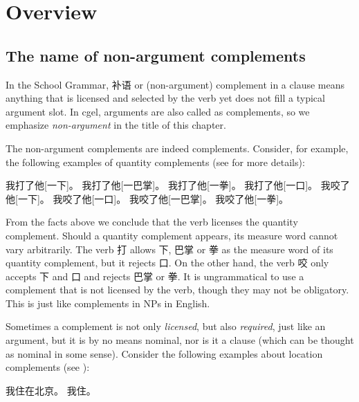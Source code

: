 \documentclass[../main.tex]{subfiles}
\begin{document}

\section{Overview}

\subsection{The name of non-argument complements}

In the School Grammar, 补语 or (non-argument) complement in a clause means anything that is licensed and 
selected by the verb yet does not fill a typical argument slot. In \ac{cgel}, arguments are also called 
as complements, so we emphasize \emph{non-argument} in the title of this chapter. 

The non-argument complements are indeed complements. Consider, for example, the following examples
of quantity complements (see  for more details):
\begin{exe}
    \ex \begin{xlist}
        \ex 我打了他[一下]。
        \ex 我打了他[一巴掌]。
        \ex 我打了他[一拳]。
        \ex *我打了他[一口]。
        \ex 我咬了他[一下]。
        \ex 我咬了他[一口]。
        \ex *我咬了他[一巴掌]。
        \ex *我咬了他[一拳]。
    \end{xlist}
\end{exe}
From the facts above we conclude that the verb licenses the quantity complement. Should a quantity
complement appears, its measure word cannot vary arbitrarily. The verb 打 allows 下, 巴掌 or 拳 as 
the measure word of its quantity complement, but it rejects 口. 
On the other hand, the verb 咬 only accepts 下 and 口 and rejects 巴掌 or 拳.
It is ungrammatical to use a complement that is not licensed by the verb, though they may not be 
obligatory. This is just like complements in NPs in English.

Sometimes a complement is not only \emph{licensed}, but also \emph{required}, just like an argument,
but it is by no means nominal, nor is it a clause (which can be thought as nominal in some sense). 
Consider the following examples about location complements (see ):
\begin{exe}
    \ex \begin{xlist}
        \ex 我住在北京。
        \ex *我住。
    \end{xlist}
\end{exe}
\end{document}
